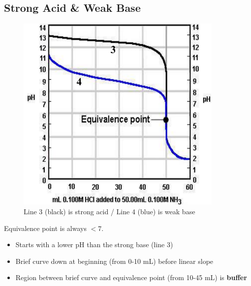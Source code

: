 \documentclass[a4paper,12pt]{article}
\begin{document}
\subsection{Strong Acid \& Weak Base}
\begin{figure}[H]
    \centering
    \includegraphics[width=0.9\textwidth]{strongacid-weakbase}
    \caption{Line 3 (black) is strong acid / Line 4 (blue) is weak base}
\end{figure}

Equivalence point is always $< 7$.

\begin{itemize}
    \item{Starts with a lower pH than the strong base (line 3)}
    \item{Brief curve down at beginning (from 0-10 mL) before linear slope}
    \item{Region between brief curve and equivalence point (from 10-45 mL) is \textbf{buffer}}
\end{itemize}
\end{document}
